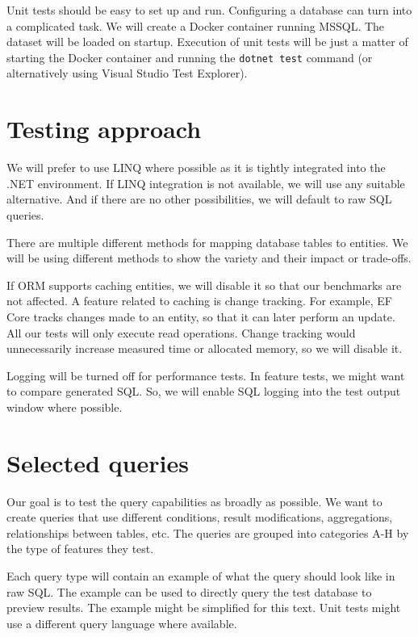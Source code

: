 Unit tests should be easy to set up and run. Configuring a database can turn into a complicated task. We will create a Docker container running MSSQL. The dataset will be loaded on startup. Execution of unit tests will be just a matter of starting the Docker container and running the \texttt{dotnet test} command (or alternatively using Visual Studio Test Explorer). 

\section{Testing approach}\label{sec:testing_approach}
We will prefer to use LINQ where possible as it is tightly integrated into the .NET environment. 
If LINQ integration is not available, we will use any suitable alternative. And if there are no other possibilities, we will default to raw SQL queries. 

There are multiple different methods for mapping database tables to entities. We will be using different methods to show the variety and their impact or trade-offs. 

If ORM supports caching entities, we will disable it so that our benchmarks are not affected. 
A feature related to caching is change tracking. For example, EF Core tracks changes made to an entity, so that it can later perform an update. All our tests will only execute read operations. Change tracking would unnecessarily increase measured time or allocated memory, so we will disable it.

Logging will be turned off for performance tests. In feature tests, we might want to compare generated SQL. So, we will enable SQL logging into the test output window where possible.


\section{Selected queries}\label{sec:selected_queries}
Our goal is to test the query capabilities as broadly as possible. We want to create queries that use different conditions, result modifications, aggregations, relationships between tables, etc. The queries are grouped into categories A-H by the type of features they test.

Each query type will contain an example of what the query should look like in raw SQL. The example can be used to directly query the test database to preview results. The example might be simplified for this text. Unit tests might use a different query language where available.

